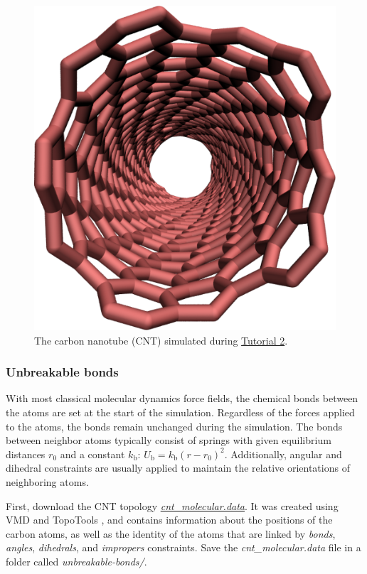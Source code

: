 \documentclass[9pt,tutorial]{livecoms}
\newcommand{\filepath}{https://raw.githubusercontent.com/lammpstutorials/lammpstutorials-article/main/files/}
\begin{document}
\begin{figure}
\centering
\includegraphics[width=0.55\linewidth]{CNT}
\caption{The carbon nanotube (CNT) simulated during
\hyperref[carbon-nanotube-label]{Tutorial 2}.}
\label{fig:CNT}
\end{figure}

\subsubsection{Unbreakable bonds}
With most classical molecular dynamics force fields, the chemical
bonds between the atoms are set at the start of the simulation. Regardless
of the forces applied to the atoms, the bonds remain unchanged during the
simulation. The bonds between neighbor atoms typically consist of springs
with given equilibrium distances $r_0$ and a constant
$k_\text{b}$: $U_\text{b} = k_\text{b} \left( r - r_0 \right)^2$. Additionally, angular and dihedral
constraints are usually applied to maintain the relative orientations of
neighboring atoms.

First, download the CNT topology
\href{\filepath tutorial2/unbreakable-bonds/cnt_molecular.data}{\textit{cnt\_molecular.data}}.
It was created using VMD and TopoTools \cite{kohlmeyer2017topotools}, and contains
information about the positions of the carbon atoms, as well as the identity of
the atoms that are linked by \textit{bonds}, \textit{angles}, \textit{dihedrals},
and \textit{impropers} constraints. Save the \textit{cnt\_molecular.data} file
in a folder called \textit{unbreakable-bonds/}.
\end{document}
